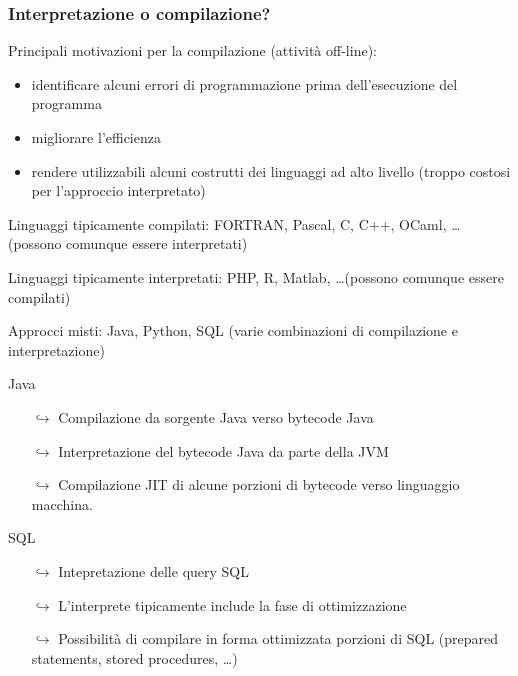 \documentclass[11pt]{article}
\begin{document}
    \subsubsection{Interpretazione o compilazione?}
        Principali motivazioni per la compilazione (attività off-line):
        \begin{itemize}
            \item identificare alcuni errori di programmazione prima dell'esecuzione del programma
            \item migliorare l'efficienza
            \item rendere utilizzabili alcuni costrutti dei linguaggi ad alto livello (troppo costosi per l'approccio interpretato)
        \end{itemize}
    
        Linguaggi tipicamente compilati: FORTRAN, Pascal, C, C++, OCaml, \dots \quad (possono comunque essere interpretati)
    
        Linguaggi tipicamente interpretati: PHP, R, Matlab, \dots \quad (possono comunque essere compilati)
    
        Approcci misti: Java, Python, SQL (varie combinazioni di compilazione e interpretazione)
    
        \begin{example}{Java}{}
            \begin{itemize}
                \item[$\hookrightarrow$] Compilazione da sorgente Java verso bytecode Java
    
                \item[$\hookrightarrow$] Interpretazione del bytecode Java da parte della JVM
    
                \item[$\hookrightarrow$] Compilazione JIT di alcune porzioni di bytecode verso linguaggio macchina.
            \end{itemize}
        \end{example}
    
        \begin{example}{SQL}{}
            \begin{itemize}
                \item[$\hookrightarrow$] Intepretazione delle query SQL
    
                \item[$\hookrightarrow$] L'interprete tipicamente include la fase di ottimizzazione
    
                \item[$\hookrightarrow$] Possibilità di compilare in forma ottimizzata porzioni di SQL (prepared statements, stored procedures, \dots)
            \end{itemize}
        \end{example}
    
\end{document}
